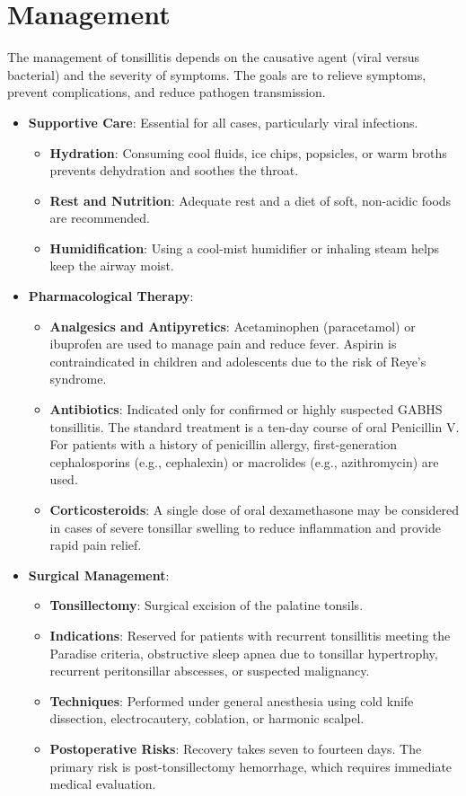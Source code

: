 \section*{Management}
The management of tonsillitis depends on the causative agent (viral versus bacterial) and the severity of symptoms. The goals are to relieve symptoms, prevent complications, and reduce pathogen transmission.
\begin{itemize}
    \item \textbf{Supportive Care}: Essential for all cases, particularly viral infections.
    \begin{itemize}
        \item \textbf{Hydration}: Consuming cool fluids, ice chips, popsicles, or warm broths prevents dehydration and soothes the throat.
        \item \textbf{Rest and Nutrition}: Adequate rest and a diet of soft, non-acidic foods are recommended.
        \item \textbf{Humidification}: Using a cool-mist humidifier or inhaling steam helps keep the airway moist.
    \end{itemize}
    \item \textbf{Pharmacological Therapy}:
    \begin{itemize}
        \item \textbf{Analgesics and Antipyretics}: Acetaminophen (paracetamol) or ibuprofen are used to manage pain and reduce fever. Aspirin is contraindicated in children and adolescents due to the risk of Reye's syndrome.
        \item \textbf{Antibiotics}: Indicated only for confirmed or highly suspected GABHS tonsillitis. The standard treatment is a ten-day course of oral Penicillin V. For patients with a history of penicillin allergy, first-generation cephalosporins (e.g., cephalexin) or macrolides (e.g., azithromycin) are used.
        \item \textbf{Corticosteroids}: A single dose of oral dexamethasone may be considered in cases of severe tonsillar swelling to reduce inflammation and provide rapid pain relief.
    \end{itemize}
    \item \textbf{Surgical Management}:
    \begin{itemize}
        \item \textbf{Tonsillectomy}: Surgical excision of the palatine tonsils.
        \item \textbf{Indications}: Reserved for patients with recurrent tonsillitis meeting the Paradise criteria, obstructive sleep apnea due to tonsillar hypertrophy, recurrent peritonsillar abscesses, or suspected malignancy.
        \item \textbf{Techniques}: Performed under general anesthesia using cold knife dissection, electrocautery, coblation, or harmonic scalpel.
        \item \textbf{Postoperative Risks}: Recovery takes seven to fourteen days. The primary risk is post-tonsillectomy hemorrhage, which requires immediate medical evaluation.
    \end{itemize}
\end{itemize}

